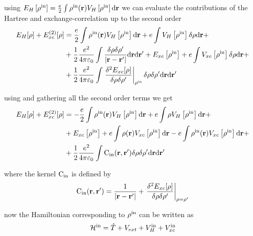 \par{using $E_{H}\left[ \rho^{{\textrm{in}}}\right]=\frac{e}{2}\int \rho^{{\textrm{in}}}({\bf r})V_{H}\left[ \rho^{{\textrm{in}}}\right] \text{d}{{\bf r}}$ we can evaluate the contributions of the Hartree and exchange-correlation up to the second order}
\begin{equation}
\begin{split}
 E_H[\rho]+E_{xc}^{(2)}[\rho] & = \frac{e}{2}\int \rho^{{\textrm{in}}}({\bf r})V_{H}\left[ \rho^{{\textrm{in}}}\right] \text{d}{{\bf r}} + e\int V_{H}\left[ \rho^{{\textrm{in}}}\right] \delta \rho \text{d}{{\bf r}} + \\ & +  \frac{1}{2}\frac{e^2}{4 \pi \varepsilon_0} \int \frac{\delta \rho\delta \rho'}{|{\bf r}-{\bf r'}|}\text{d} {\bf r} \text{d} {\bf r'} + E_{xc}\left[ \rho^{{\textrm{in}}}\right] + e\int V_{xc}\left[ \rho^{{\textrm{in}}}\right]\delta \rho \text{d} {\bf r} + \\ & + \frac{1}{2}\frac{e^2}{4\pi \varepsilon_0}\int \left . \frac{\delta^{2} E_{xc}[\rho]}{\delta \rho \delta \rho'}\right|_{\rho^{{\textrm{in}}}} \delta \rho \delta \rho' \text{d} {\bf r} \text{d} {\bf r'} 
\end{split}
\label{eq:ehexc}
\end{equation}
\par{using  and gathering all the second order terms we get}
 \begin{equation}
\begin{split}
 E_H[\rho]+E_{xc}^{(2)}[\rho] & = -\frac{e}{2}\int \rho^{{\textrm{in}}}({\bf r})V_{H}\left[ \rho^{{\textrm{in}}}\right] \text{d}{{\bf r}} + e\int \rho V_{H}\left[ \rho^{{\textrm{in}}}\right] \text{d}{{\bf r}} + \\ & + E_{xc}\left[ \rho^{{\textrm{in}}}\right] + e\int \rho({\bf r})V_{xc}\left[ \rho^{{\textrm{in}}}\right] \text{d}{{\bf r}} - e\int \rho^{{\textrm{in}}}({\bf r})V_{xc}\left[ \rho^{{\textrm{in}}}\right] \text{d}{{\bf r}}+ \\ &+ \frac{1}{2}\frac{e^2}{4\pi \varepsilon_0}\int {\textrm{C}}_{{\textrm{in}}}({\bf r},{\bf r'}) \delta \rho \delta \rho' \text{d} {\bf r} \text{d} {\bf r'} 
\end{split}
\label{eq:b}
\end{equation}
\par{where the kernel ${\textrm{C}}_{{\textrm{in}}}$ is defined by}
\begin{equation}
 {\textrm{C}}_{{\textrm{in}}}({\bf r},{\bf r'})=\frac{1}{|{\bf r}-{\bf r'}|}+\left .\frac{\delta^{2} E_{xc}[\rho]}{\delta \rho \delta \rho'}\right |_{\rho=\rho'}
\end{equation}
\par{now the Hamiltonian corresponding to $\rho^{{\textrm{in}}}$ can be written as}
\begin{equation}
  \mathcal{H} ^{{\textrm{in}}} = \hat{T} + V_{ext}+V_{H}^{{\textrm{in}}}+V_{xc}^{{\textrm{in}}}
\end{equation}
